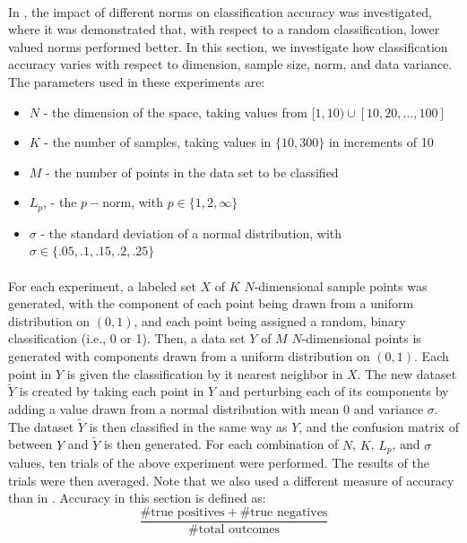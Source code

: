 \documentclass{article}
\begin{document}
\paragraph{}
In \cite{aggarwal2001surprising}, the impact of different norms on classification accuracy was investigated, where it was demonstrated that, with respect to a random classification, lower valued norms performed better. In this section, we investigate how classification accuracy varies with respect to dimension, sample size, norm, and data variance. The parameters used in these experiments are:
\begin{itemize}
\item $N$ - the dimension of the space, taking values from $[1,10)\cup[10,20,\ldots,100]$
\item $K$ - the number of samples, taking values in $\{10,300\}$ in increments of 10
\item $M$ - the number of points in the data set to be classified
\item $L_p$, - the $p-$norm, with $p\in\{1,2,\infty\}$
\item $\sigma$ - the standard deviation of a normal distribution, with $\sigma\in\{.05,.1,.15,.2,.25\}$
\end{itemize}
\paragraph{}
For each experiment, a labeled set $X$ of $K$ $N$-dimensional sample points was generated, with the component of each point being drawn from a uniform distribution on $(0,1)$, and each point being assigned a random, binary classification (i.e., 0 or 1). Then, a data set $Y$ of $M$ $N$-dimensional points is generated with components drawn  from a uniform distribution on $(0,1)$. Each point in $Y$ is given the classification by it nearest neighbor in $X$. The new dataset $\tilde{Y}$ is created by taking each point in $Y$ and perturbing each of its components by adding a value drawn from a normal distribution with mean $0$ and variance $\sigma$. The dataset $\tilde{Y}$ is then classified in the same way as $Y$, and the confusion matrix of between $Y$ and $\tilde{Y}$ is then generated.
For each combination of $N$, $K$, $L_p$, and $\sigma$ values, ten trials of the above experiment were performed. The results of the trials were then averaged. Note that we also used a different measure of accuracy than in \cite{aggarwal2001surprising}. Accuracy in this section is defined as:
$$
	\dfrac{\#\textrm{true positives}+\#\textrm{true negatives}}{\#\textrm{total outcomes}}
$$
\end{document}
